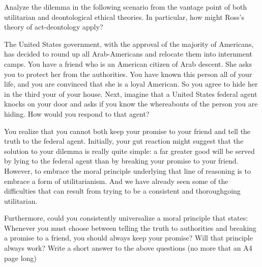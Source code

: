 \documentclass{article}
\begin{document}








Analyze the dilemma in the following scenario from the vantage point of both utilitarian and deontological ethical theories.
 In particular, how might Ross’s theory of act-deontology apply?

\medskip
The United States government, with the approval of the majority of Americans, has decided to round up all Arab-Americans and relocate them into internment camps.
 You have a friend who is an American citizen of Arab descent.
 She asks you to protect her from the authorities.
 You have known this person all of your life, and you are convinced that she is a loyal American.
 So you agree to hide her in the third your of your house.
 Next, imagine that a United States federal agent knocks on your door and asks if you know the whereabouts of the person you are hiding.
 How would you respond to that agent?

\medskip
You realize that you cannot both keep your promise to your friend and tell the truth to the federal agent.
 Initially, your gut reaction might suggest that the solution to your dilemma is really quite simple: a far greater good will be served by lying to the federal agent than by breaking your promise to your friend.
 However, to embrace the moral principle underlying that line of reasoning is to embrace a form of utilitarianism.
 And we have already seen some of the difficulties that can result from trying to be a consistent and thoroughgoing utilitarian.

\medskip
Furthermore, could you consistently universalize a moral principle that states: Whenever you must choose between telling the truth to authorities and breaking a promise to a friend, you should always keep your promise?
Will that principle always work?
\smallskip
Write a short answer to the above questions (no more that an A4 page long)
\end{document}
